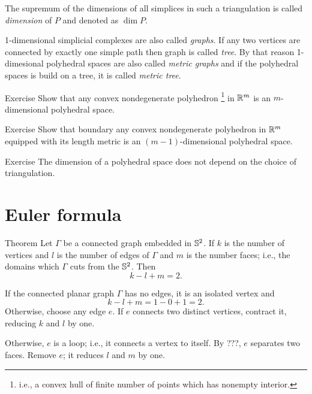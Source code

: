 The supremum of the dimensions of all simplices in such a triangulation is called \emph{dimension} of $P$
and denoted as $\dim P$.

1-dimensional simplicial complexes are also called \emph{graphs}.
If any two vertices are connected by exactly one simple path then graph is called \emph{tree}.
By that reason 1-dimesional polyhedral spaces are also called \emph{metric graphs}
and if the polyhedral spaces is build on a tree, it is called \emph{metric tree}.

\begin{thm}{Exercise}
 Show that any convex nondegenerate polyhedron%
\footnote{i.e., a convex hull of finite number of points which has nonempty interior.}
 in $\mathbb{R}^m$ is an $m$-dimensional polyhedral space.
\end{thm}

\begin{thm}{Exercise}\label{ex:bry-is-poly}
Show that boundary any convex nondegenerate polyhedron%
\footnotemark[\value{footnote}] in $\mathbb{R}^m$ equipped with its length metric is an $(m-1)$-dimensional polyhedral space.
\end{thm}
 

\begin{thm}{Exercise}\label{ex:dim-poly}
The dimension of a polyhedral space does not depend on the choice of triangulation.
\end{thm}


\section{Euler formula}

\begin{thm}{Theorem}\label{thm:euler}
Let $\Gamma$ be a connected graph embedded in $\mathbb{S}^2$.
If $k$ is the number of vertices
and $l$ is the number of edges of $\Gamma$
and $m$ is the number faces; i.e., the domains%
 which $\Gamma$ cuts from the $\mathbb{S}^2$.
Then 
\[k-l+m=2.\]

\end{thm}

If the connected planar graph $\Gamma$ has no edges, it is an isolated vertex and 
\[k-l+m=1-0+1=2.\] 
Otherwise, choose any edge $e$. 
If $e$ connects two distinct vertices, 
contract it, 
reducing $k$ and $l$ by one. 

Otherwise, $e$ is a loop;
i.e., it connects a vertex to itself. 
By ???, $e$ separates two faces.
Remove $e$;
it reduces $l$ and $m$ by one. 

